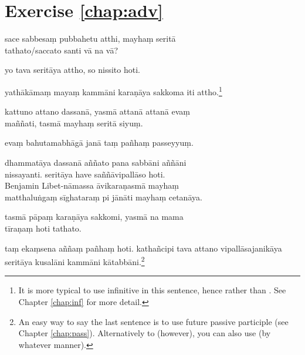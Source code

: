 \section*{Exercise \ref{chap:adv}}
\begin{answerkey}
\item sace sabbesa\d m pubbahetu atthi, mayha\d m serit\=a \\tathato/saccato santi v\=a na v\=a?
\item yo tava serit\=aya attho, so nissito hoti.
\item yath\=ak\=ama\d m maya\d m kamm\=ani kara\d n\=aya sakkoma iti attho.\footnote{It is more typical to use infinitive in this sentence, hence  rather than . See Chapter \ref{chap:inf} for more detail.}
\item kattuno attano dassan\=a, yasm\=a attan\=a attan\=a eva\d m \\ma\~n\~nati, tasm\=a mayha\d m serit\=a siyu\d m.
\item eva\d m bahutamabh\=ag\=a jan\=a ta\d m pa\~nha\d m passeyyu\d m.
\item dhammat\=aya dassan\=a a\~n\~nato pana sabb\=ani a\~n\~n\=ani \\nissayanti. serit\=aya have sa\~n\~n\=avipall\=aso hoti. \\Benjamin Libet-n\=amassa \=avikara\d nasm\=a mayha\d m \\matthalu\.nga\d m s\=ighatara\d m pi j\=an\=ati mayha\d m cetan\=aya.
\item tasm\=a p\=apa\d m kara\d n\=aya sakkomi, yasm\=a na mama \\t\=ira\d na\d m hoti tathato.
\item ta\d m eka\d msena a\~n\~na\d m pa\~nha\d m hoti. katha\~ncipi tava attano vipall\=asajanik\=aya serit\=aya kusal\=ani kamm\=ani k\=atabb\=ani.\footnote{An easy way to say the last sentence is to use future passive participle (see Chapter \ref{chap:pass}). Alternatively to  (however), you can also use  (by whatever manner).} 
\end{answerkey}


